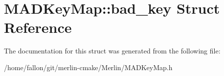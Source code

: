 \hypertarget{structMADKeyMap_1_1bad__key}{}\section{M\+A\+D\+Key\+Map\+:\+:bad\+\_\+key Struct Reference}
\label{structMADKeyMap_1_1bad__key}


The documentation for this struct was generated from the following file\+:\begin{DoxyCompactItemize}
\item 
/home/fallon/git/merlin-\/cmake/\+Merlin/M\+A\+D\+Key\+Map.\+h\end{DoxyCompactItemize}
